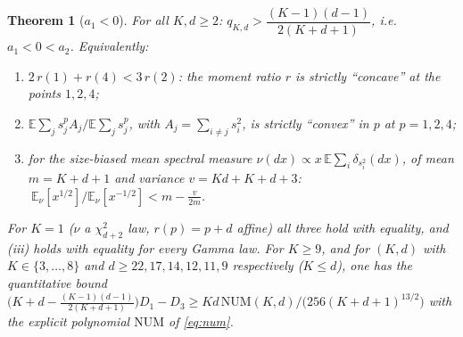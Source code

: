 \documentclass[10pt]{article}
\newtheorem{theorem}{Theorem}
\theoremstyle{definition}
\theoremstyle{remark}
\newcommand{\E}{\mathbb{E}}
\begin{document}
\begin{theorem}[$a_1<0$]\label{thm:a1}
For all $K,d\ge2$: $q_{K,d}>\dfrac{(K-1)(d-1)}{2(K+d+1)}$, i.e.\ $a_1<0<a_2$. Equivalently:
\begin{enumerate}[label=(\roman*),itemsep=0pt,topsep=2pt]
\item $2\,r(1)+r(4)<3\,r(2)$: the moment ratio $r$ is strictly ``concave'' at the points $1,2,4$;
\item $\E\sum_j s_j^pA_j/\E\sum_js_j^p$, with $A_j=\sum_{i\ne j}s_i^2$, is strictly ``convex'' in $p$ at $p=1,2,4$;
\item for the size-biased mean spectral measure $\nu(dx)\propto x\,\E\sum_i\delta_{s_i^2}(dx)$, of mean $m=K+d+1$ and
variance $v=Kd+K+d+3$: $\ \E_\nu[x^{1/2}]/\E_\nu[x^{-1/2}]<m-\frac v{2m}$.
\end{enumerate}
For $K=1$ ($\nu$ a $\chi^2_{d+2}$ law, $r(p)=p+d$ affine) all three hold with equality, and (iii) holds with equality
for every Gamma law. For $K\ge9$, and for $(K,d)$ with $K\in\{3,\dots,8\}$ and $d\ge22,17,14,12,11,9$ respectively
($K\le d$), one has the quantitative bound
$\big(K+d-\frac{(K-1)(d-1)}{2(K+d+1)}\big)D_1-D_3\ge Kd\,\mathrm{NUM}(K,d)/\big(256(K+d+1)^{13/2}\big)$ with the explicit
polynomial $\mathrm{NUM}$ of \eqref{eq:num}.
\end{theorem}
\end{document}
